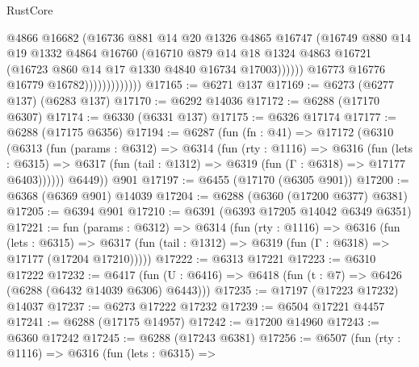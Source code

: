 \begin{lexlean}{RustCore}
\begin{coremodule}
                                  @4866
                                  @16682
                                  (@16736
                                    @881
                                    @14
                                    @20
                                    @1326
                                    @4865
                                    @16747
                                    (@16749
                                      @880
                                      @14
                                      @19
                                      @1332
                                      @4864
                                      @16760
                                      (@16710
                                        @879
                                        @14
                                        @18
                                        @1324
                                        @4863
                                        @16721
                                        (@16723 @860 @14 @17 @1330 @4840 @16734 @17003))))))
                              @16773
                              @16776
                              @16779
                              @16782)))))))))))))
@17165 := @6271 @137
@17169 := @6273 (@6277 @137) (@6283 @137)
@17170 := @6292 @14036
@17172 := @6288 (@17170 @6307)
@17174 := @6330 (@6331 @137)
@17175 := @6326 @17174
@17177 := @6288 (@17175 @6356)
@17194 := @6287
    (fun (fn : @41) =>
    @17172
      (@6310
        (@6313
          (fun (params : @6312) =>
          @6314
            (fun (rty : @1116) =>
            @6316
              (fun (lets : @6315) =>
              @6317 (fun (tail : @1312) => @6319 (fun (Γ : @6318) => @17177 @6403))))))
        @6449))
    @901
@17197 := @6455 (@17170 (@6305 @901))
@17200 := @6368 (@6369 @901) @14039
@17204 := @6288 (@6360 (@17200 @6377) @6381)
@17205 := @6394 @901
@17210 := @6391 (@6393 @17205 @14042 @6349 @6351)
@17221 := fun (params : @6312) =>
  @6314
    (fun (rty : @1116) =>
    @6316
      (fun (lets : @6315) =>
      @6317 (fun (tail : @1312) => @6319 (fun (Γ : @6318) => @17177 (@17204 @17210)))))
@17222 := @6313 @17221
@17223 := @6310 @17222
@17232 := @6417
    (fun (U : @6416) => @6418 (fun (t : @7) => @6426 (@6288 (@6432 @14039 @6306) @6443)))
@17235 := @17197 (@17223 @17232) @14037
@17237 := @6273 @17222 @17232
@17239 := @6504 @17221 @4457
@17241 := @6288 (@17175 @14957)
@17242 := @17200 @14960
@17243 := @6360 @17242
@17245 := @6288 (@17243 @6381)
@17256 := @6507
    (fun (rty : @1116) =>
    @6316
      (fun (lets : @6315) =>

\end{coremodule}
\end{lexlean}
